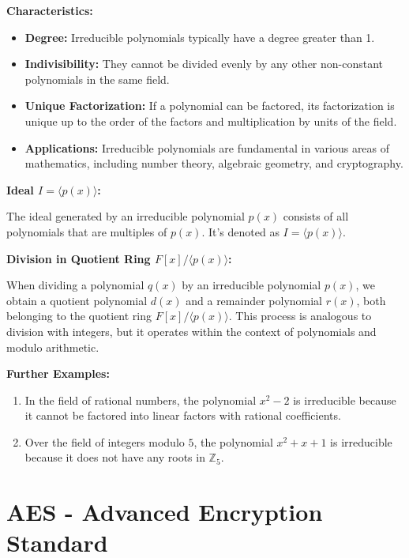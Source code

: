 \documentclass[11pt]{article}
\begin{document}
\textbf{Characteristics:}
\begin{itemize}
    \item \textbf{Degree:} Irreducible polynomials typically have a degree greater than 1.
    \item \textbf{Indivisibility:} They cannot be divided evenly by any other non-constant polynomials in the same field.
    \item \textbf{Unique Factorization:} If a polynomial can be factored, its factorization is unique up to the order of the factors and multiplication by units of the field.
    \item \textbf{Applications:} Irreducible polynomials are fundamental in various areas of mathematics, including number theory, algebraic geometry, and cryptography.
\end{itemize}

\vspace{5mm}

\textbf{Ideal $I = \langle p(x) \rangle$:}

The ideal generated by an irreducible polynomial $p(x)$ consists of all polynomials that are multiples of $p(x)$. It's denoted as $I = \langle p(x) \rangle$.

\vspace{5mm}

\textbf{Division in Quotient Ring $F[x]/\langle p(x) \rangle$:}

When dividing a polynomial $q(x)$ by an irreducible polynomial $p(x)$, we obtain a quotient polynomial $d(x)$ and a remainder polynomial $r(x)$, both belonging to the quotient ring $F[x]/\langle p(x) \rangle$. This process is analogous to division with integers, but it operates within the context of polynomials and modulo arithmetic.

\vspace{5mm}

\textbf{Further Examples:}
\begin{enumerate}
    \item In the field of rational numbers, the polynomial $x^2 - 2$ is irreducible because it cannot be factored into linear factors with rational coefficients.
    \item Over the field of integers modulo $5$, the polynomial $x^2 + x + 1$ is irreducible because it does not have any roots in $\mathbb{Z}_5$.
\end{enumerate}



\section*{AES - Advanced Encryption Standard}
\end{document}
